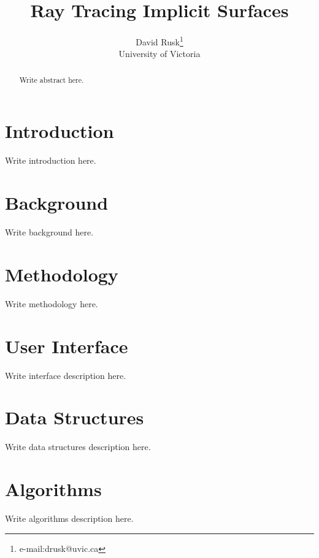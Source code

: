 \documentclass[conference]{acmsiggraph}
\title{Ray Tracing Implicit Surfaces}
\author{David Rusk\thanks{e-mail:drusk@uvic.ca}\\University of Victoria}
\begin{document}
\maketitle

\begin{abstract}

Write abstract here. \cite{KalraBarr1989}

\end{abstract}

\keywordlist


\TOGlinkslist


\copyrightspace

\section{Introduction}

Write introduction here.

\section{Background}

Write background here.

\section{Methodology}

Write methodology here.

\section{User Interface}

Write interface description here.

\section{Data Structures}

Write data structures description here.

\section{Algorithms}

Write algorithms description here.
\end{document}

